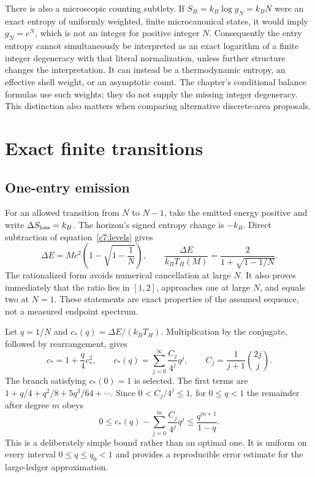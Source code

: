 There is also a microscopic counting subtlety. If $S_H=k_B\log g_N=k_BN$ were an exact entropy of uniformly weighted, finite microcanonical states, it would imply $g_N=e^N$, which is not an integer for positive integer $N$. Consequently the entry entropy cannot simultaneously be interpreted as an exact logarithm of a finite integer degeneracy with that literal normalization, unless further structure changes the interpretation. It can instead be a thermodynamic entropy, an effective shell weight, or an asymptotic count. The chapter's conditional balance formulas use such weights; they do not supply the missing integer degeneracy. This distinction also matters when comparing alternative discrete-area proposals.

\section{Exact finite transitions}
\subsection{One-entry emission}
For an allowed transition from $N$ to $N-1$, take the emitted energy positive and write $\Delta S_{\rm loss}=k_B$. The horizon's signed entropy change is $-k_B$. Direct subtraction of equation~\eqref{c7:levels} gives
\begin{equation}
 \Delta E=Mc^2\left(1-\sqrt{1-\frac1N}\right),\qquad
 \frac{\Delta E}{k_BT_H(M)}
 =\frac{2}{1+\sqrt{1-1/N}}.
 \label{c7:onestep}
\end{equation}
The rationalized form avoids numerical cancellation at large $N$. It also proves immediately that the ratio lies in $[1,2]$, approaches one at large $N$, and equals two at $N=1$. These statements are exact properties of the assumed sequence, not a measured endpoint spectrum.

Let $q=1/N$ and $c_*(q)=\Delta E/(k_BT_H)$. Multiplication by the conjugate, followed by rearrangement, gives
\begin{equation}
 c_*=1+\frac q4c_*^2,
 \qquad c_*(q)=\sum_{j=0}^{\infty}\frac{C_j}{4^j}q^j,
 \qquad C_j=\frac{1}{j+1}\binom{2j}{j}.
 \label{c7:catalan}
\end{equation}
The branch satisfying $c_*(0)=1$ is selected. The first terms are $1+q/4+q^2/8+5q^3/64+\cdots$. Since $0<C_j/4^j\le1$, for $0\le q<1$ the remainder after degree $m$ obeys
\begin{equation}
 0\le c_*(q)-\sum_{j=0}^{m}\frac{C_j}{4^j}q^j
 \le\frac{q^{m+1}}{1-q}.
 \label{c7:remainder}
\end{equation}
This is a deliberately simple bound rather than an optimal one. It is uniform on every interval $0\le q\le q_0<1$ and provides a reproducible error estimate for the large-ledger approximation.

